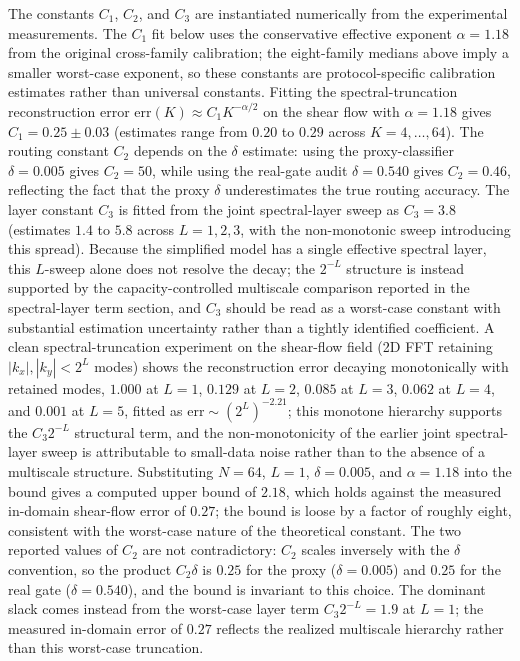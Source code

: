 \documentclass[preprint,12pt]{elsarticle}
\begin{document}
The constants $C_1$, $C_2$, and $C_3$ are instantiated numerically from the experimental measurements. The $C_1$ fit below uses the conservative effective exponent $\alpha=1.18$ from the original cross-family calibration; the eight-family medians above imply a smaller worst-case exponent, so these constants are protocol-specific calibration estimates rather than universal constants. Fitting the spectral-truncation reconstruction error $\mathrm{err}(K)\approx C_1 K^{-\alpha/2}$ on the shear flow with $\alpha=1.18$ gives $C_1=0.25\pm0.03$ (estimates range from $0.20$ to $0.29$ across $K=4,\dots,64$). The routing constant $C_2$ depends on the $\delta$ estimate: using the proxy-classifier $\delta=0.005$ gives $C_2=50$, while using the real-gate audit $\delta=0.540$ gives $C_2=0.46$, reflecting the fact that the proxy $\delta$ underestimates the true routing accuracy. The layer constant $C_3$ is fitted from the joint spectral-layer sweep as $C_3=3.8$ (estimates $1.4$ to $5.8$ across $L=1,2,3$, with the non-monotonic sweep introducing this spread). Because the simplified model has a single effective spectral layer, this $L$-sweep alone does not resolve the decay; the $2^{-L}$ structure is instead supported by the capacity-controlled multiscale comparison reported in the spectral-layer term section, and $C_3$ should be read as a worst-case constant with substantial estimation uncertainty rather than a tightly identified coefficient. A clean spectral-truncation experiment on the shear-flow field (2D FFT retaining $|k_x|,|k_y|<2^L$ modes) shows the reconstruction error decaying monotonically with retained modes, $1.000$ at $L=1$, $0.129$ at $L=2$, $0.085$ at $L=3$, $0.062$ at $L=4$, and $0.001$ at $L=5$, fitted as $\mathrm{err}\sim(2^L)^{-2.21}$; this monotone hierarchy supports the $C_3 2^{-L}$ structural term, and the non-monotonicity of the earlier joint spectral-layer sweep is attributable to small-data noise rather than to the absence of a multiscale structure. Substituting $N=64$, $L=1$, $\delta=0.005$, and $\alpha=1.18$ into the bound gives a computed upper bound of $2.18$, which holds against the measured in-domain shear-flow error of $0.27$; the bound is loose by a factor of roughly eight, consistent with the worst-case nature of the theoretical constant. The two reported values of $C_2$ are not contradictory: $C_2$ scales inversely with the $\delta$ convention, so the product $C_2\delta$ is $0.25$ for the proxy ($\delta=0.005$) and $0.25$ for the real gate ($\delta=0.540$), and the bound is invariant to this choice. The dominant slack comes instead from the worst-case layer term $C_3 2^{-L}=1.9$ at $L=1$; the measured in-domain error of $0.27$ reflects the realized multiscale hierarchy rather than this worst-case truncation.
\end{document}
